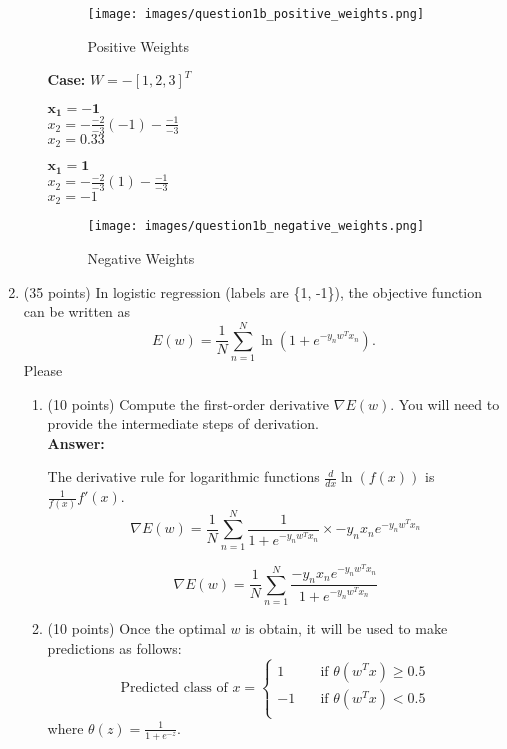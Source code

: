 \documentclass[11pt]{article}
\begin{document}
\begin{enumerate}
\begin{enumerate}
\begin{figure}[H]
    \centering
    \texttt{[image: images/question1b\_positive\_weights.png]}
    \caption{Positive Weights}
    \label{fig:enter-label}
\end{figure}

\textbf{Case:} $W = -[1, 2, 3]^T$\vspace{0.5cm}

\begin{minipage}{0.45\textwidth}
    \textbf{$\boldsymbol{x_1 = -1}$}\\
    $x_2 = - \frac{-2}{-3}(-1) - \frac{-1}{-3}$\\
    $x_2 = 0.33$
\end{minipage}
\hfill %
\begin{minipage}{0.45\textwidth}
    \textbf{$\boldsymbol{x_1 = 1}$}\\
    $x_2 = - \frac{-2}{-3}(1) - \frac{-1}{-3}$\\
    $x_2 = -1$
\end{minipage}

    \begin{figure}[H]
        \centering
        \texttt{[image: images/question1b\_negative\_weights.png]}
        \caption{Negative Weights}
        \label{fig:enter-label}
    \end{figure}


\end{enumerate}
\item (35 points) In logistic regression (labels are \{1, -1\}),
the objective function  can be written as
$$E(w)=\frac{1}{N}\sum_{n=1}^N\ln\left(1+e^{-y_n
w^Tx_n}\right).$$ Please
\begin{enumerate}
\item (10 points) Compute the first-order derivative $\nabla E(w)$. You will need to provide the intermediate steps of derivation.\\

    \textbf{Answer:}
    
The derivative rule for logarithmic functions $\frac{d}{dx}\ln(f(x))$ is $\frac{1}{f(x)}f'(x)$.
\[\nabla E(w) = \frac{1}{N} \sum_{n=1}^N\frac{1}{1+e^{-y_nw^Tx_n}} \times -y_n x_n e^{-y_n w^T x_n}\]

\[\nabla E(w) = \frac{1}{N} \sum_{n=1}^N\frac{-y_n x_n e^{-y_n w^T x_n}}{1+e^{-y_nw^Tx_n}}\]

\item (10 points) Once the optimal $w$ is obtain, it will be used to make
predictions as follows:
\[ \mbox{Predicted class of }x =
  \begin{cases}
    1       & \quad \text{if } \theta(w^Tx)\geq 0.5\\
    -1  & \quad \text{if } \theta(w^Tx)<0.5\\
  \end{cases}
\]
where $\theta(z)=\frac{1}{1+e^{-z}}$.


\end{enumerate}
\end{enumerate}
\end{document}
